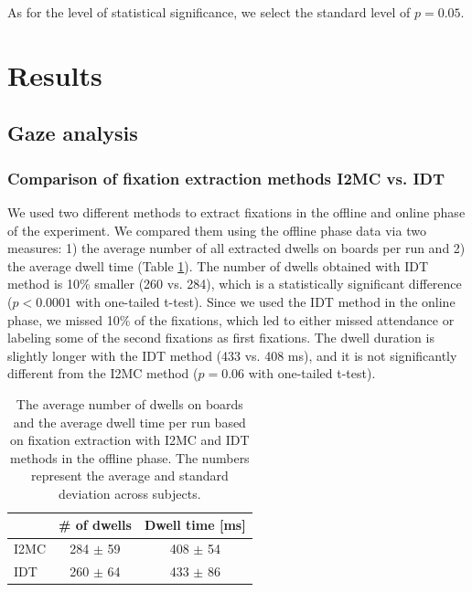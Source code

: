 \documentclass[12pt]{iopart}
\begin{document}
As for the level of statistical significance, we select the standard level of $p = 0.05$.

\section{Results}
\label{sec:results}
\subsection{Gaze analysis}

\subsubsection*{Comparison of fixation extraction methods I2MC vs. IDT}
We used two different methods to extract fixations in the offline 
and online phase of the experiment. We compared them using
the offline phase data via two measures: 1) the average number of all extracted
dwells on boards per run and 2) the average dwell time (Table \ref{tab:EyeMethods}).
The number of dwells obtained with IDT method is 10\% smaller (260 vs. 284),
which is a statistically significant difference
($p < 0.0001$ with one-tailed t-test).
Since we used the IDT method in the online phase,
we missed 10\% of the fixations, which led
to either missed attendance or labeling some of the second
fixations as first fixations.
The dwell duration is slightly longer with the IDT method (433 vs. 408 ms),
and it is not significantly different from the I2MC method
($p = 0.06$ with one-tailed t-test).

\begin{table}
    \centering
    \caption{The average number of dwells on boards and the average 
        dwell time per run
    based on fixation extraction with I2MC and IDT methods in the
    offline phase.
    The numbers represent the average and standard deviation across subjects.
}
    \begin{tabular}{l | c |c}
        \hline 
        & \# of dwells & Dwell time [ms] \\
        \hline 
        I2MC & 284 $\pm$ 59  & 408 $\pm$ 54 \\
        IDT & 260 $\pm$ 64  & 433 $\pm$ 86 \\
        \hline 
    \end{tabular}
    \label{tab:EyeMethods}
\end{table}
\end{document}
